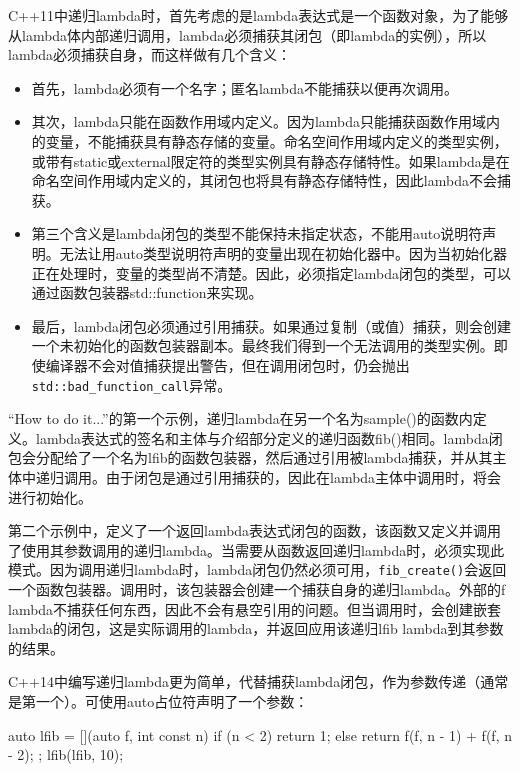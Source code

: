 
C++11中递归lambda时，首先考虑的是lambda表达式是一个函数对象，为了能够从lambda体内部递归调用，lambda必须捕获其闭包（即lambda的实例），所以lambda必须捕获自身，而这样做有几个含义：

\begin{itemize}
\item
首先，lambda必须有一个名字；匿名lambda不能捕获以便再次调用。

\item
其次，lambda只能在函数作用域内定义。因为lambda只能捕获函数作用域内的变量，不能捕获具有静态存储的变量。命名空间作用域内定义的类型实例，或带有static或external限定符的类型实例具有静态存储特性。如果lambda是在命名空间作用域内定义的，其闭包也将具有静态存储特性，因此lambda不会捕获。

\item
第三个含义是lambda闭包的类型不能保持未指定状态，不能用auto说明符声明。无法让用auto类型说明符声明的变量出现在初始化器中。因为当初始化器正在处理时，变量的类型尚不清楚。因此，必须指定lambda闭包的类型，可以通过函数包装器std::function来实现。

\item
最后，lambda闭包必须通过引用捕获。如果通过复制（或值）捕获，则会创建一个未初始化的函数包装器副本。最终我们得到一个无法调用的类型实例。即使编译器不会对值捕获提出警告，但在调用闭包时，仍会抛出\verb|std::bad_function_call|异常。
\end{itemize}

“How to do it...”的第一个示例，递归lambda在另一个名为sample()的函数内定义。lambda表达式的签名和主体与介绍部分定义的递归函数fib()相同。lambda闭包会分配给了一个名为lfib的函数包装器，然后通过引用被lambda捕获，并从其主体中递归调用。由于闭包是通过引用捕获的，因此在lambda主体中调用时，将会进行初始化。

第二个示例中，定义了一个返回lambda表达式闭包的函数，该函数又定义并调用了使用其参数调用的递归lambda。当需要从函数返回递归lambda时，必须实现此模式。因为调用递归lambda时，lambda闭包仍然必须可用，\verb|fib_create()|会返回一个函数包装器。调用时，该包装器会创建一个捕获自身的递归lambda。外部的f lambda不捕获任何东西，因此不会有悬空引用的问题。但当调用时，会创建嵌套lambda的闭包，这是实际调用的lambda，并返回应用该递归lfib lambda到其参数的结果。

C++14中编写递归lambda更为简单，代替捕获lambda闭包，作为参数传递（通常是第一个）。可使用auto占位符声明了一个参数：

\begin{cpp}
auto lfib = [](auto f, int const n)
{
    if (n < 2) return 1;
    else return f(f, n - 1) + f(f, n - 2);
};
lfib(lfib, 10);
\end{cpp}

